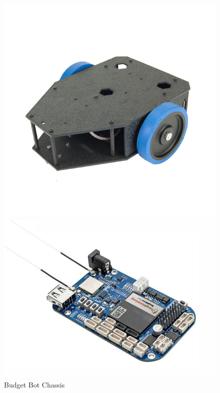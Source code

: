 \documentclass[letterpaper,12pt]{article}   %
\begin{document}
\begin{figure}
  \centering
  \begin{minipage}[t]{0.32\textwidth}
    \includegraphics[width=1\textwidth]{figs/img/budgetbot_chassis}
    \captionsetup{width=\textwidth}
    \caption{Budget Bot Chassis}
    \label{fig:budgetBotChassis}
  \end{minipage}%
  \begin{minipage}[t]{0.32\textwidth}
    \includegraphics[width=1\textwidth]{figs/img/beaglebone_blue}

\end{minipage}
\end{figure}
\end{document}
